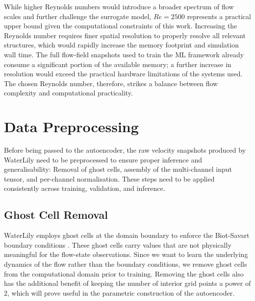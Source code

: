 While higher Reynolds numbers would introduce a broader spectrum of flow scales and further challenge the surrogate model, $Re=2500$ represents a practical upper bound given the computational constraints of this work. Increasing the Reynolds number requires finer spatial resolution to properly resolve all relevant structures, which would rapidly increase the memory footprint and simulation wall time. The full flow-field snapshots used to train the ML framework already consume a significant portion of the available memory; a further increase in resolution would exceed the practical hardware limitations of the systems used. The chosen Reynolds number, therefore, strikes a balance between flow complexity and computational practicality. 


\section{Data Preprocessing}
\label{sect: preprocessing}

Before being passed to the autoencoder, the raw velocity snapshots produced by WaterLily need to be preprocessed to ensure proper inference and generalisability: Removal of ghost cells, assembly of the multi-channel input tensor, and per-channel normalisation. These steps need to be applied consistently across training, validation, and inference. 


\subsection{Ghost Cell Removal}
\label{sect: ghostcells}

WaterLily employs ghost cells at the domain boundary to enforce the Biot-Savart boundary conditions \cite{BiotWeymouth2025}. These ghost cells carry values that are not physically meaningful for the flow-state observations. Since we want to learn the underlying dynamics of the flow rather than the boundary conditions, we remove ghost cells from the computational domain prior to training. Removing the ghost cells also has the additional benefit of keeping the number of interior grid points a power of 2, which will prove useful in the parametric construction of the autoencoder. 

